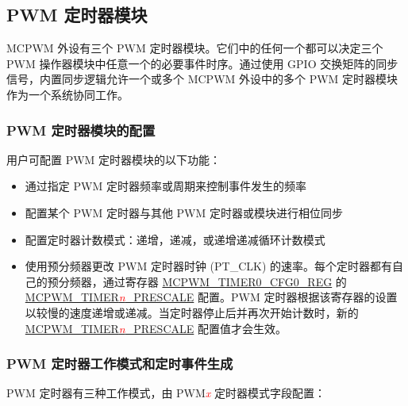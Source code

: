 \documentclass[main\_\_CN.tex]{subfiles}
\begin{document}
\subsection{PWM 定时器模块}
\label{sec:mcpwm-timer-sub}

MCPWM 外设有三个 PWM 定时器模块。它们中的任何一个都可以决定三个 PWM 操作器模块中任意一个的必要事件时序。通过使用 GPIO 交换矩阵的同步信号，内置同步逻辑允许一个或多个 MCPWM 外设中的多个 PWM 定时器模块作为一个系统协同工作。

\subsubsection{PWM 定时器模块的配置 }
用户可配置 PWM 定时器模块的以下功能：

\begin{itemize}
    \item 通过指定 PWM 定时器频率或周期来控制事件发生的频率
    \item 配置某个 PWM 定时器与其他 PWM 定时器或模块进行相位同步
    \item 配置定时器计数模式：递增，递减，或递增递减循环计数模式
    \item 使用预分频器更改 PWM 定时器时钟 (PT\_CLK) 的速率。每个定时器都有自己的预分频器，通过寄存器 \hyperref[regdesc:MCPWMTIMERNCFG0REG]{MCPWM\_TIMER0\_CFG0\_REG} 的 \hyperref[fielddesc:MCPWMTIMERNPRESCALE]{MCPWM\_TIMER\textcolor{red}{\it{n}}\_PRESCALE} 配置。PWM 定时器根据该寄存器的设置以较慢的速度递增或递减。当定时器停止后并再次开始计数时，新的\hyperref[fielddesc:MCPWMTIMERNPRESCALE]{MCPWM\_TIMER\textcolor{red}{\it{n}}\_PRESCALE} 配置值才会生效。
\end{itemize}

\subsubsection{PWM 定时器工作模式和定时事件生成}

PWM 定时器有三种工作模式，由 PWM\textcolor{red}{\it{x}} 定时器模式字段配置：
\end{document}
